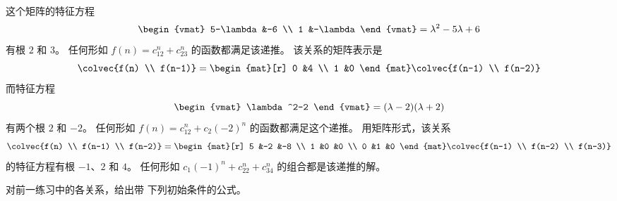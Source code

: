 \begin{exercises}
\begin{answer}
\begin{exparts}
        这个矩阵的特征方程
        \begin{equation*}
          \begin{vmat}
            5-\lambda &-6       \\
            1         &-\lambda
          \end{vmat}
          =\lambda^2-5\lambda+6 
        \end{equation*}
        有根 $2$ 和 $3$。
        任何形如
        $f(n)=c_12^n+c_23^n$
        的函数都满足该递推。
      \partsitem 
        该关系的矩阵表示是
        \begin{equation*}
          \colvec{f(n) \\ f(n-1)}
          =
          \begin{mat}[r]
            0  &4  \\
            1  &0  
          \end{mat}
          \colvec{f(n-1) \\ f(n-2)}
        \end{equation*}
        而特征方程
        \begin{equation*}
          \begin{vmat}
            \lambda^2-2       
          \end{vmat}
          =(\lambda-2)(\lambda+2)
        \end{equation*}
        有两个根 $2$ 和 $-2$。
        任何形如
        $f(n)=c_12^n+c_2(-2)^n$
        的函数都满足这个递推。
      \partsitem 
        用矩阵形式，该关系
        \begin{equation*}
          \colvec{f(n) \\ f(n-1) \\ f(n-2)}
          =
          \begin{mat}[r]
            5  &-2  &-8  \\
            1  &0  &0  \\
            0  &1  &0
          \end{mat}
          \colvec{f(n-1) \\ f(n-2) \\ f(n-3)}
        \end{equation*}
        的特征方程有根 $-1$、$2$ 和 $4$。
        任何形如
        $c_1(-1)^n+c_22^n+c_34^n$ 的组合都是该递推的解。
    \end{exparts} 
   \end{answer}
  \item \label{exer:SolvePartRecurSoltn} 
    对前一练习中的各关系，给出带
    下列初始条件的公式。

\end{exercises}
